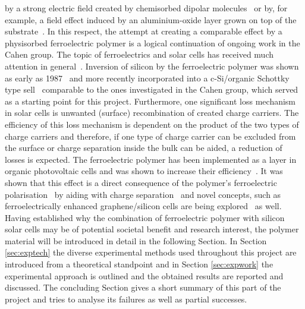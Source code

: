 by a strong electric field created by chemisorbed dipolar molecules~\cite{ann_inversion} or by, for example, a field effect induced by an aluminium-oxide layer grown on top of the substrate~\cite{ann_inversion2}. In this respect, the attempt at creating a comparable effect by a physisorbed ferroelectric polymer is a logical continuation of ongoing work in the Cahen group. The topic of ferroelectrics and solar cells has received much attention in general~\cite{yuan_ferrooverview}. Inversion of silicon by the ferroelectric polymer was shown as early as 1987~\cite{langlois_inversion} and more recently incorporated into a c-Si/organic Schottky type sell~\cite{liu_THEpaper} comparable to the ones investigated in the Cahen group, which served as a starting point for this project. Furthermore, one significant loss mechanism in solar cells is unwanted (surface) recombination of created charge carriers. The efficiency of this loss mechanism is dependent on the product of the two types of charge carriers and therefore, if one type of charge carrier can be excluded from the surface or charge separation inside the bulk can be aided, a reduction of losses is expected. The ferroelectric polymer has been implemented as a  layer in organic photovoltaic cells and was shown to increase their efficiency~\cite{asadi_opvenhancement}. It was shown that this effect is a direct consequence of the polymer's ferroelectric polarisation~\cite{yuan_opvenhancement} by aiding with charge separation~\cite{nalwa_enhancedopvchargesep} and novel concepts, such as ferroelectrically enhanced graphene/silicon cells are being explored~\cite{yu_gr-fe-si-cell} as well.\\
Having established why the combination of ferroelectric polymer with silicon solar cells may be of potential societal benefit and research interest, the polymer material will be introduced in detail in the following Section. In Section \ref{sec:exptech} the diverse experimental methods used throughout this project are introduced from a theoretical standpoint and in Section \ref{sec:expwork} the experimental approach is outlined and the obtained results are reported and discussed. The concluding Section gives a short summary of this part of the project and tries to analyse its failures as well as partial successes.

